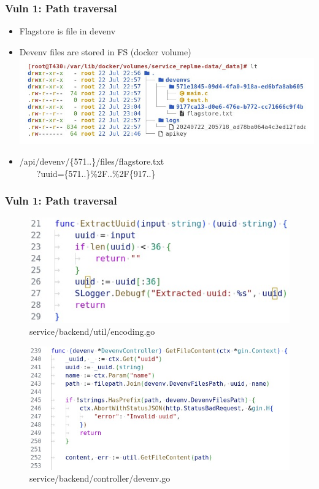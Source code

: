 \documentclass[10pt]{beamer}
\begin{document}
\begin{frame}
	\frametitle{Vuln 1: Path traversal}
	\begin{itemize}
		\item<1-> Flagstore is file in devenv
		\item<2-> Devenv files are stored in FS (docker volume)
		      \includegraphics[scale=1.4]{volume-border}
		\item<3-> /api/devenv/\{571..\}/files/flagstore.txt \\
		      \ \ \ \ ?uuid=\{571..\}\%2F..\%2F\{917..\}
	\end{itemize}
\end{frame}

\begin{frame}
	\frametitle{Vuln 1: Path traversal}
	\begin{minipage}{0.39\linewidth}
		\begin{figure}
			\includegraphics[scale=0.25]{extract-uuid}
			\caption{service/backend/util/encoding.go}
		\end{figure}
	\end{minipage}
	\hspace{0.03\linewidth}
	\begin{minipage}{0.5\linewidth}
		\begin{figure}
			\includegraphics[scale=0.25]{get-file-content}
			\caption{service/backend/controller/devenv.go}
		\end{figure}
	\end{minipage}
\end{frame}
\end{document}
